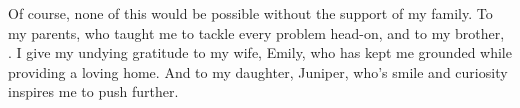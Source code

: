 Of course, none of this would be possible without the support of my family. To my parents, who taught me to tackle every problem head-on, and to my brother, . I give my undying gratitude to my wife, Emily, who has kept me grounded while providing a loving home. And to my daughter, Juniper, who's smile and curiosity inspires me to push further.
 